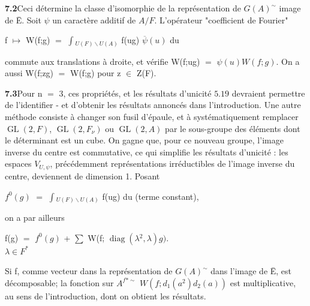\documentclass[10pt,a4paper]{article}
\begin{document}
\par\noindent\textbf{7.2}\quad Ceci détermine la classe d'isomorphie de la représentation de $G(A)^\sim$ image de Ē. Soit $\psi{}$ un caractère additif de $A/F$. L'opérateur "coefficient de Fourier"\par
\par f $\mapsto{}$ W(f;g) $=$ $\int{}_{U(F)\backslash U(A)}$ f(ug) $\overline{\psi{}}(u)$ du\par
\par commute aux translations à droite, et vérifie W(f;ug) $=$ $\psi{}(u)W(f;g)$. On a aussi W(f;zg) $=$ W(f;g) pour z $\in{}$ Z(F).\par
\par\noindent\textbf{7.3}\quad Pour n $=$ 3, ces propriétés, et les résultats d'unicité $5.19$ devraient permettre de l'identifier - et d'obtenir les résultats annoncés dans l'introduction. Une autre méthode consiste à changer son fusil d'épaule, et à systématiquement remplacer $\operatorname{GL}(2,F)$, $\operatorname{GL}(2,F_\nu{})$ ou $\operatorname{GL}(2,A)$ par le sous-groupe des éléments dont le déterminant est un cube. On gagne que, pour ce nouveau groupe, l'image inverse du centre est commutative, ce qui simplifie les résultats d'unicité : les espaces $V_{U,\psi{}}$, précédemment représentations irréductibles de l'image inverse du centre, deviennent de dimension 1. Posant\par
\par $f^0(g)$ $=$ $\int{}_{U(F)\backslash U(A)}$ f(ug) du (terme constant),\par
\par on a par ailleurs\par
\par\smallskip\begin{center}\begin{minipage}{0.96\textwidth}\centering
f(g) $=$ $f^0(g)$ + $\sum{}$ W(f; $\operatorname{diag}(\lambda{}^2,\lambda{})g)$. \\ $\lambda{}\in{}F^*$
\end{minipage}\end{center}\smallskip

\clearpage
{}
\label{d035-physical-032}
\par Si f, comme vecteur dans la représentation de $G(A)^\sim$ dans l'image de Ē, est décomposable; la fonction sur $A^{f*\sim}$ $W(f;d_1(a^2)d_2(a))$ est multiplicative, au sens de l'introduction, dont on obtient les résultats.\par
\end{document}
